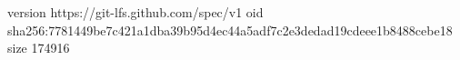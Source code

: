 version https://git-lfs.github.com/spec/v1
oid sha256:7781449be7c421a1dba39b95d4ec44a5adf7c2e3dedad19cdeee1b8488cebe18
size 174916
